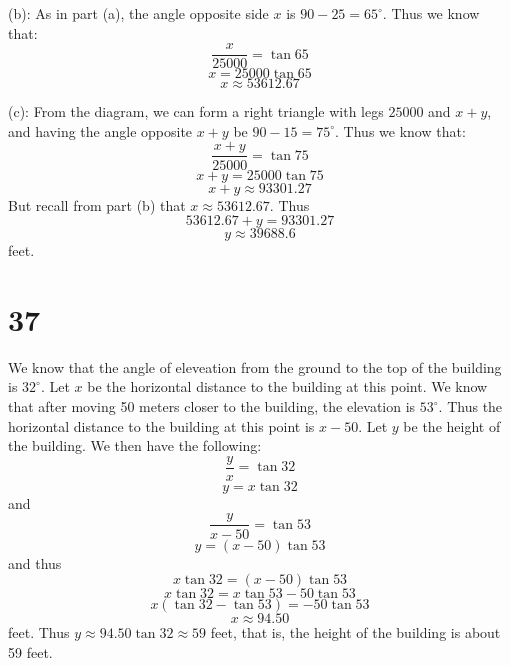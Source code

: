 \documentclass{article}
\theoremstyle{definition}
\newcommand{\?}{\stackrel{?}{=}}
\begin{document}
(b): As in part (a), the angle opposite side $x$ is $90-25=65^\circ$. Thus we know that:
\[ \frac{x}{25000}=\tan 65 \]
\[ x=25000\tan 65 \]
\[ x\approx 53612.67 \]


(c): From the diagram, we can form a right triangle with legs $25000$ and $x+y$, and having the angle opposite $x+y$ be 
$90-15=75^\circ$. Thus we know that:
\[ \frac{x+y}{25000}=\tan 75 \]
\[ x+y=25000\tan 75 \]
\[ x+y\approx 93301.27 \]
But recall from part (b) that $x\approx 53612.67$. Thus
\[ 53612.67+y=93301.27 \]
\[ y\approx 39688.6 \] feet.

\section*{37}
We know that the angle of eleveation from the ground to the top of the building is $32^\circ$. Let $x$ be the horizontal distance to the building at this point. We know that after moving 50 
meters closer to the building, the elevation is $53^\circ$. Thus the horizontal distance to the building at this point is $x-50$. Let $y$ be the height of the building. We then have the 
following:
\[ \frac{y}{x}=\tan 32 \] \[ y=x\tan 32 \]
and \[ \frac{y}{x-50}=\tan 53 \] \[ y=(x-50)\tan 53 \]
and thus
\[ x\tan 32=(x-50)\tan 53 \]
\[ x\tan 32=x\tan 53-50\tan 53 \]
\[ x(\tan 32-\tan 53)=-50\tan 53 \]
\[ x\approx 94.50 \]
feet. Thus $y\approx 94.50\tan 32\approx 59$ feet, that is, the height of the building is about 59 feet.
\end{document}
